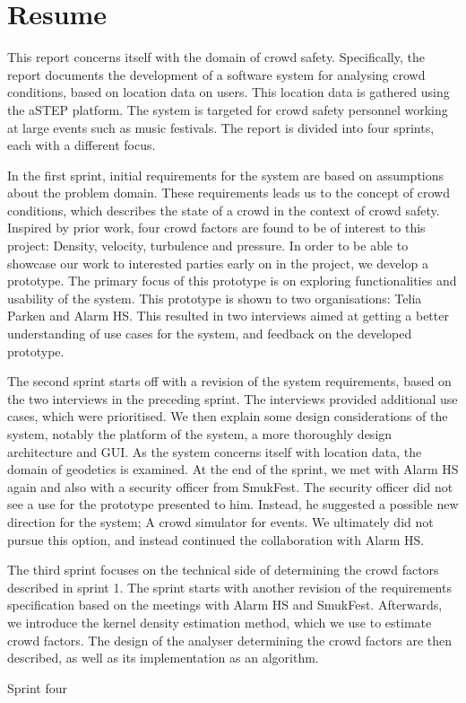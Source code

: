 \chapter*{Resume}

This report concerns itself with the domain of crowd safety. Specifically, the report documents the development of a software system for analysing crowd conditions, based on location data on users. This location data is gathered using the aSTEP platform. The system is targeted for crowd safety personnel working at large events such as music festivals. The report is divided into four sprints, each with a different focus.

In the first sprint, initial requirements for the system are based on assumptions about the problem domain. These requirements leads us to the concept of crowd conditions, which describes the state of a crowd in the context of crowd safety. Inspired by prior work, four crowd factors are found to be of interest to this project: Density, velocity, turbulence and pressure. In order to be able to showcase our work to interested parties early on in the project, we develop a prototype. The primary focus of this prototype is on exploring functionalities and usability of the system. This prototype is shown to two organisations: Telia Parken and Alarm HS. This resulted in two interviews aimed at getting a better understanding of use cases for the system, and feedback on the developed prototype.

The second sprint starts off with a revision of the system requirements, based on the two interviews in the preceding sprint. The interviews provided additional use cases, which were prioritised. We then explain some design considerations of the system, notably the platform of the system, a more thoroughly design architecture and GUI. As the system concerns itself with location data, the domain of geodetics is examined. At the end of the sprint, we met with Alarm HS again and also with a security officer from SmukFest. The security officer did not see a use for the prototype presented to him. Instead, he suggested a possible new direction for the system; A crowd simulator for events. We ultimately did not pursue this option, and instead continued the collaboration with Alarm HS.

The third sprint focuses on the technical side of determining the crowd factors described in sprint 1. The sprint starts with another revision of the requirements specification based on the meetings with Alarm HS and SmukFest. Afterwards, we introduce the kernel density estimation method, which we use to estimate crowd factors. The design of the analyser determining the crowd factors are then described, as well as its implementation as an algorithm.

Sprint four 